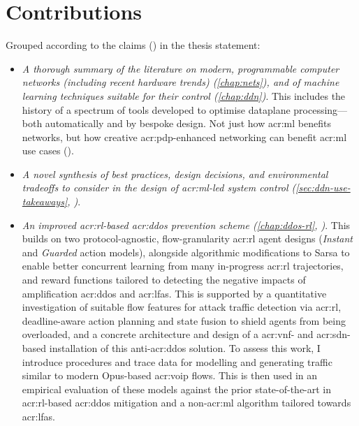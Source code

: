 \section{Contributions}
Grouped according to the claims () in the thesis statement:
\begin{itemize}
	\item \emph{A thorough summary of the literature on modern, programmable computer networks (including recent hardware trends) (\cref{chap:nets}), and of machine learning techniques suitable for their control (\cref{chap:ddn})}. This includes the history of a spectrum of tools developed to optimise dataplane processing---both automatically and by bespoke design. Not just how \gls{acr:ml} benefits networks, but how creative \gls{acr:pdp}-enhanced networking can benefit \gls{acr:ml} use cases ().
	
	\item \emph{A novel synthesis of best practices, design decisions, and environmental tradeoffs to consider in the design of \gls{acr:ml}-led system control (\cref{sec:ddn-use-takeaways}, )}.
	
	\item \emph{An improved \gls{acr:rl}-based \gls{acr:ddos} prevention scheme (\cref{chap:ddos-rl}, )}.
	This builds on two protocol-agnostic, flow-granularity \gls{acr:rl} agent designs (\emph{Instant} and \emph{Guarded} action models), alongside algorithmic modifications to Sarsa to enable better concurrent learning from many in-progress \gls{acr:rl} trajectories, and reward functions tailored to detecting the negative impacts of amplification \gls{acr:ddos} and \glspl{acr:lfa}.
	This is supported by a quantitative investigation of suitable flow features for attack traffic detection via \gls{acr:rl}, deadline-aware action planning and state fusion to shield agents from being overloaded, and a concrete architecture and design of a \gls{acr:vnf}- and \gls{acr:sdn}-based installation of this anti-\gls{acr:ddos} solution.
	To assess this work, I introduce procedures and trace data for modelling and generating traffic similar to modern Opus-based \gls{acr:voip} flows.
	This is then used in an empirical evaluation of these models against the prior state-of-the-art in \gls{acr:rl}-based \gls{acr:ddos} mitigation and a  non-\gls{acr:ml} algorithm tailored towards \glspl{acr:lfa}.
		

\end{itemize}
